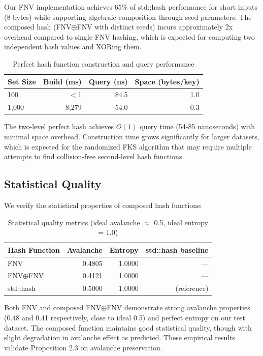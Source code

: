 \documentclass[11pt,a4paper]{article}
\theoremstyle{definition}
\begin{document}
Our FNV implementation achieves 65\% of std::hash performance for short inputs (8 bytes) while supporting algebraic composition through seed parameters. The composed hash (FNV$\oplus$FNV with distinct seeds) incurs approximately 2x overhead compared to single FNV hashing, which is expected for computing two independent hash values and XORing them.

\begin{table}[h]
\centering
\caption{Perfect hash function construction and query performance}
\begin{tabular}{lrrr}
\toprule
\textbf{Set Size} & \textbf{Build (ms)} & \textbf{Query (ns)} & \textbf{Space (bytes/key)} \\
\midrule
100 & $<$1 & 84.5 & 1.0 \\
1,000 & 8,279 & 54.0 & 0.3 \\
\bottomrule
\end{tabular}
\end{table}

The two-level perfect hash achieves $O(1)$ query time (54-85 nanoseconds) with minimal space overhead. Construction time grows significantly for larger datasets, which is expected for the randomized FKS algorithm that may require multiple attempts to find collision-free second-level hash functions.

\subsection{Statistical Quality}

We verify the statistical properties of composed hash functions:

\begin{table}[h]
\centering
\caption{Statistical quality metrics (ideal avalanche $\approx$ 0.5, ideal entropy = 1.0)}
\begin{tabular}{lrrr}
\toprule
\textbf{Hash Function} & \textbf{Avalanche} & \textbf{Entropy} & \textbf{std::hash baseline} \\
\midrule
FNV & 0.4805 & 1.0000 & --- \\
FNV$\oplus$FNV & 0.4121 & 1.0000 & --- \\
std::hash & 0.5000 & 1.0000 & (reference) \\
\bottomrule
\end{tabular}
\end{table}

Both FNV and composed FNV$\oplus$FNV demonstrate strong avalanche properties (0.48 and 0.41 respectively, close to ideal 0.5) and perfect entropy on our test dataset. The composed function maintains good statistical quality, though with slight degradation in avalanche effect as predicted. These empirical results validate Proposition 2.3 on avalanche preservation.
\end{document}
